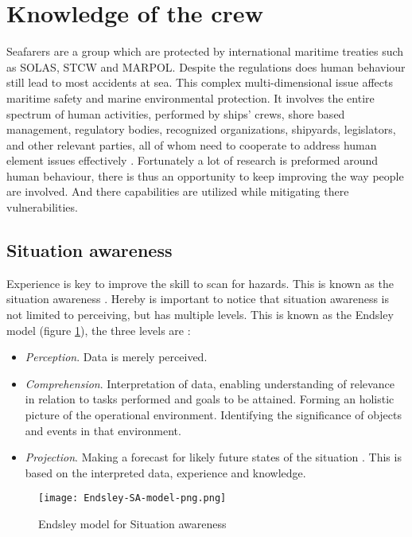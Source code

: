 \section{Knowledge of the crew}
\label{sec:knowledge}
Seafarers are a group which are protected by international maritime treaties such as \ac{SOLAS}, \ac{STCW} and \ac{MARPOL}. Despite the regulations does human behaviour still lead to most accidents at sea. This complex multi-dimensional issue affects maritime safety and marine environmental protection. It involves the entire spectrum of human activities, performed by ships' crews, shore based management, regulatory bodies, recognized organizations, shipyards, legislators, and other relevant parties, all of whom need to cooperate to address human element issues effectively \cite{IMO2017}.
Fortunately a lot of research is preformed around human behaviour, there is thus an opportunity to keep improving the way people are involved. And there capabilities are utilized while mitigating there vulnerabilities.

\subsection{Situation awareness}
Experience is key to improve the skill to scan for hazards. This is known as the situation awareness \cite{Underwood2013}. Hereby is important to notice that situation awareness is not limited to perceiving, but has multiple levels. This is known as the Endsley model (figure \ref{fig:Endsley-SA-model}), the three levels are \cite{Kalloniatis2017}: 
\begin{itemize}
	\item \emph{Perception}. Data is merely perceived.
	\item \emph{Comprehension}. Interpretation of data, enabling understanding of relevance in relation to tasks performed and goals to be attained. Forming an holistic picture of the operational environment. Identifying the significance of objects and events in that environment.
	\item \emph{Projection}. Making a forecast for likely future states of the situation . This is based on the interpreted data, experience and knowledge.
\end{itemize}

\begin{figure}[hb]
	\centering
	\texttt{[image: Endsley-SA-model-png.png]}
	\caption{Endsley model for Situation awareness}
	\label{fig:Endsley-SA-model}
\end{figure}


